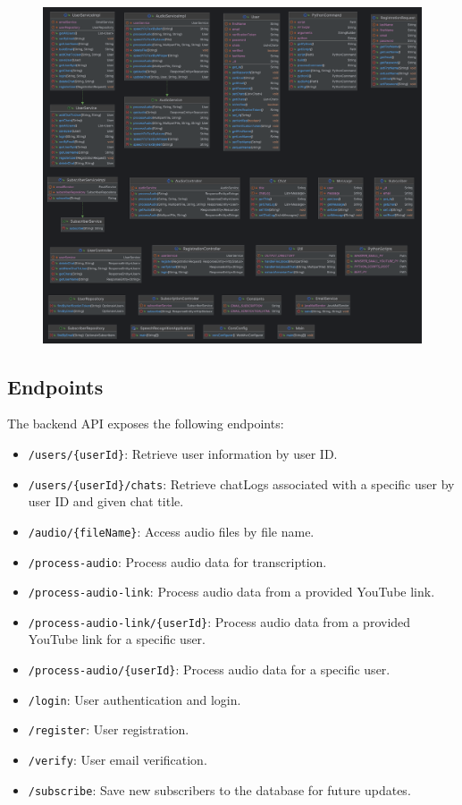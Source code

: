 \documentclass[conference]{IEEEtran}
\begin{document}
\begin{figure}[ht]
\centering
\includegraphics[width=\textwidth]{UML_Diagram.png}
    \label{fig:database_structure}
\end{figure}


\subsection{Endpoints}

The backend API exposes the following endpoints:

\begin{itemize}
    \item \texttt{/users/\{userId\}}: Retrieve user information by user ID.
    \item \texttt{/users/\{userId\}/chats}: Retrieve chatLogs associated with a specific user by user ID and given chat title.
    \item \texttt{/audio/\{fileName\}}: Access audio files by file name.
    \item \texttt{/process-audio}: Process audio data for transcription.
    \item \texttt{/process-audio-link}: Process audio data from a provided YouTube link.
    \item \texttt{/process-audio-link/\{userId\}}: Process audio data from a provided YouTube link for a specific user.
    \item \texttt{/process-audio/\{userId\}}: Process audio data for a specific user.
    \item \texttt{/login}: User authentication and login.
    \item \texttt{/register}: User registration.
    \item \texttt{/verify}: User email verification.
    \item \texttt{/subscribe}: Save new subscribers to the database for future updates.
\end{itemize}
\end{document}

